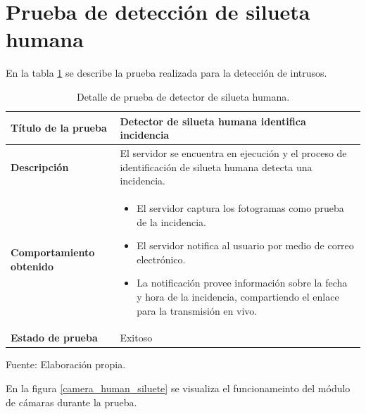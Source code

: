 \section{Prueba de detección de silueta humana}

En la tabla \ref{table_human_siluete} se describe la prueba realizada para la detección de intrusos.

\begin{table}[H]
    \caption{Detalle de prueba de detector de silueta humana.}
    \begin{center}
        \begin{tabular}{|>{\centering}p{}|m{}<{\centering}|} 
            \hline
            \textbf{Título de la prueba} & \textbf{Detector de silueta humana identifica incidencia} \\
            \hline
            \textbf{Descripción} & El servidor se encuentra en ejecución y el proceso de identificación de silueta humana detecta una incidencia.\\
            \hline
            \textbf{Comportamiento obtenido} & 
            \begin{itemize}
                \item El servidor captura los fotogramas como prueba de la incidencia.
                \item El servidor notifica al usuario por medio de correo electrónico.
                \item La notificación provee información sobre la fecha y hora de la incidencia, compartiendo el enlace para la transmisión en vivo.
            \end{itemize} \\ 
            \hline
            \textbf{Estado de prueba} & Exitoso \\
            \hline
        \end{tabular}
    \end{center}
    \begin{center}
        Fuente: Elaboración propia.
        \label{table_human_siluete}
    \end{center}
\end{table}

En la figura \ref{camera_human_siluete} se visualiza el funcionameinto del módulo de cámaras durante la prueba.

